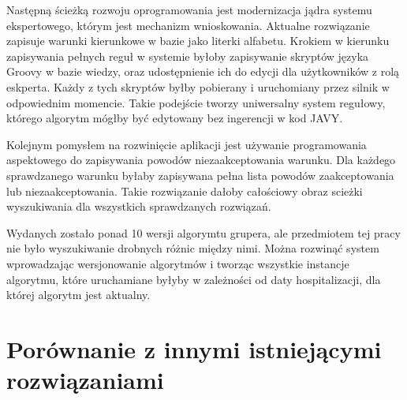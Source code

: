 Następną ścieżką rozwoju oprogramowania jest modernizacja jądra systemu ekspertowego, którym jest mechanizm wnioskowania. Aktualne rozwiązanie zapisuje warunki kierunkowe w bazie jako literki alfabetu. Krokiem w kierunku zapisywania pełnych reguł w systemie byłoby zapisywanie skryptów języka Groovy w bazie wiedzy, oraz udostępnienie ich do edycji dla użytkowników z rolą eskperta. Każdy z tych skryptów byłby pobierany i uruchomiany przez silnik w odpowiednim momencie.
Takie podejście tworzy uniwersalny system regułowy, którego algorytm mógłby być edytowany bez ingerencji w kod JAVY.

Kolejnym pomysłem na rozwinięcie aplikacji jest używanie programowania aspektowego do zapisywania powodów niezaakceptowania warunku.
Dla każdego sprawdzanego warunku byłaby zapisywana pełna lista powodów zaakceptowania lub niezaakceptowania.
Takie rozwiązanie dałoby całościowy obraz scieżki wyszukiwania dla wszystkich sprawdzanych rozwiązań.

Wydanych zostało ponad 10 wersji algorymtu grupera, ale przedmiotem tej pracy nie było wyszukiwanie drobnych różnic między nimi. Można rozwinąć system wprowadzając wersjonowanie algorytmów i tworząc wszystkie instancje algorytmu, które uruchamiane byłyby w zależności od daty hospitalizacji, dla której algorytm jest aktualny.


\section{Porównanie z innymi istniejącymi rozwiązaniami}
\label{sec:porownanieZinnymiRozwiazaniami}

